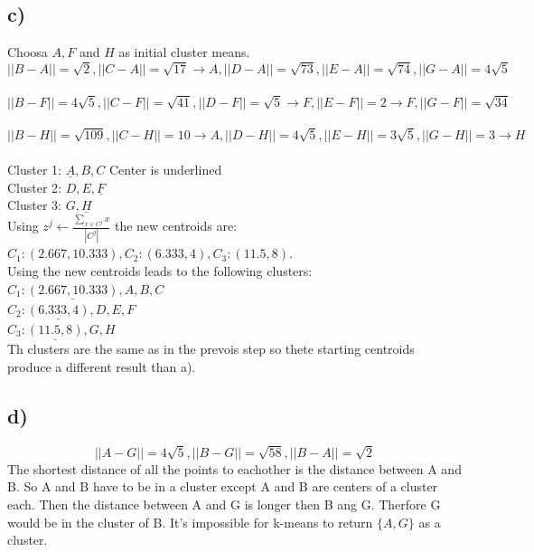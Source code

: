 \subsection*{c)}
Choosa $A,F$ and $H$ as initial cluster means.
\[||B-A||=\sqrt{2}, ||C-A||=\sqrt{17} \rightarrow A, ||D-A||=\sqrt{73}, ||E-A||=\sqrt{74},||G-A||=4\sqrt{5}\]\\
\[||B-F||=4\sqrt{5}, ||C-F||=\sqrt{41}, ||D-F||=\sqrt{5} \rightarrow F, ||E-F||=2\rightarrow F,||G-F||=\sqrt{34}\]\\
\[||B-H||=\sqrt{109}, ||C-H||=10 \rightarrow A, ||D-H||=4\sqrt{5}, ||E-H||=3\sqrt{5},||G-H||=3\rightarrow H\]\\
Cluster 1: $\underline{A},B,C$ \hfill \small Center is underlined\\
Cluster 2: $D,E,\underline{F}$\\
Cluster 3: $G,\underline{H}$\\
Using $z^j\leftarrow\frac{\sum_{x\in C^j}x}{|C^j|}$ the new centroids are:
$C_1: (2.667,10.333), C_2: (6.333,4), C_3: (11.5,8)$.\\
Using the new centroids leads to the following clusters:\\
$C_1:\underline{(2.667,10.333)},A,B,C$\\
$C_2:\underline{(6.333,4)},D,E,F$\\
$C_3:\underline{(11.5,8)},G,H$\\
Th clusters are the same as in the prevois step so thete starting centroids produce a different result than a).
\subsection*{d)}
\[||A-G||=4\sqrt{5}, ||B-G|| = \sqrt{58}, ||B-A||=\sqrt{2}\]
The shortest distance of all the points to eachother is the distance between A and B. So A and B have to be in a cluster except A and B are centers of a cluster each. Then the distance between A and G is longer then B ang G.
Therfore G would be in the cluster of B.
It's impossible for k-means to return $\lbrace A,G\rbrace$ as a cluster.